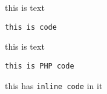 this is text

\begin{lstlisting}
this is code
\end{lstlisting}
this is text

\begin{lstlisting}
this is PHP code
\end{lstlisting}
this has \texttt{inline code} in it

